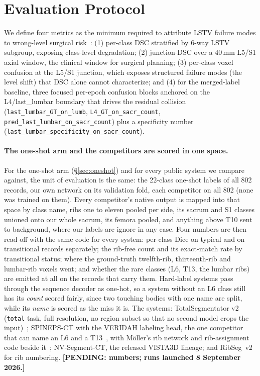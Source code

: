 \documentclass{article}
\begin{document}
\section{Evaluation Protocol}
\label{sec:protocol}

We define four metrics as the minimum required to attribute
LSTV failure modes to wrong-level surgical
risk~\citep{Maier-Hein2024MetricsValidation}: (1) per-class
DSC stratified by 6-way LSTV subgroup, exposing class-level
degradation; (2) junction-DSC over a 40\,mm L5/S1 axial
window, the clinical window for surgical planning;
(3) per-class voxel confusion at the L5/S1 junction, which
exposes structured failure modes (the level shift) that
DSC alone cannot characterize; and (4) for the merged-label
baseline, three focused per-epoch confusion blocks anchored
on the L4/last\_lumbar boundary that drives the residual
collision (\texttt{last\_lumbar\_GT\_on\_lumb},
\texttt{L4\_GT\_on\_sacr\_count},
\texttt{pred\_last\_lumbar\_on\_sacr\_count}) plus a
specificity number
(\texttt{last\_lumbar\_specificity\_on\_sacr\_count}).

\paragraph{The one-shot arm and the competitors are scored
in one space.} For the one-shot arm (\S\ref{sec:oneshot})
and for every public system we compare against, the unit
of evaluation is the same: the 22-class one-shot labels of
all 802 records, our own network on its validation fold,
each competitor on all 802 (none was trained on them).
Every competitor's native output is mapped into that space
by class name, ribs one to eleven pooled per side, its
sacrum and S1 classes unioned onto our whole sacrum, its
femora pooled, and anything above T10 sent to background,
where our labels are ignore in any case. Four numbers are
then read off with the same code for every system: per-class
Dice on typical and on transitional records separately;
the rib-free count and its exact-match rate by transitional
status; where the ground-truth twelfth-rib, thirteenth-rib
and lumbar-rib voxels went; and whether the rare classes
(L6, T13, the lumbar ribs) are emitted at all on the
records that carry them. Hard-label systems pass through the
sequence decoder as one-hot, so a system without an L6
class still has its \emph{count} scored fairly, since two
touching bodies with one name are split, while its
\emph{name} is scored as the miss it is. The systems:
TotalSegmentator v2 (\texttt{total} task, full resolution,
no region subset so that no second model crops the
input)~\citep{Wasserthal2023TotalSegmentator:Images};
SPINEPS-CT with the VERIDAH labeling head, the one
competitor that can name an L6 and a
T13~\citep{Moller2024SPINEPSautomaticSegmentation,Moller2026VERIDAH:Sequences},
with M\"oller's rib network and rib-assignment code beside
it~\citep{Moller2025StumpRib}; NV-Segment-CT, the released
VISTA3D lineage; and RibSeg~v2 for rib numbering.
\textbf{[PENDING: numbers; runs launched 8 September
2026.]}
\end{document}
